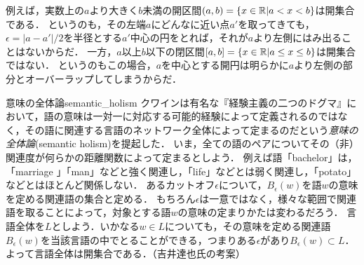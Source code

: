 \documentclass[11pt,a4paper, dvipdfmx]{jsarticle}
\begin{document}
例えば，実数上の$a$より大きく$b$未満の開区間$(a, b) = \{x \in \mathbb{R}| a < x < b\}$は開集合である．
というのも，その左端$a$にどんなに近い点$a'$を取ってきても，$\epsilon=|a-a'|/2$を半径とする$a'$中心の円をとれば，それが$a$より左側にはみ出ることはないからだ．
一方，$a$以上$b$以下の閉区間$[a, b] = \{x \in \mathbb{R}| a \leq  x \leq  b\}$は開集合ではない．
というのもこの場合，$a$を中心とする開円は明らかに$a$より左側の部分とオーバーラップしてしまうからだ．

 


\begin{rei}{意味の全体論}{semantic_holism}
クワインは有名な『経験主義の二つのドグマ』において，語の意味は一対一に対応する可能的経験によって定義されるのではなく，その語に関連する言語のネットワーク全体によって定まるのだという\emph{意味の全体論}(semantic holism)を提起した．
いま，全ての語のペアについてその（非）関連度が何らかの距離関数によって定まるとしよう．
例えば語「bachelor」は，「marriage 」「man」などと強く関連し，「life」などとは弱く関連し，「potato」などとはほとんど関係しない．
あるカットオフ$\epsilon$について，$B_\epsilon(w)$を語$w$の意味を定める関連語の集合と定める．
もちろん$\epsilon$は一意ではなく，様々な範囲で関連語を取ることによって，対象とする語$w$の意味の定まりかたは変わるだろう．
言語全体を$L$としよう．いかなる$w \in L$についても，その意味を定める関連語$B_\epsilon(w)$を当該言語の中でとることができる，つまりある$\epsilon$があり$B_\epsilon(w) \subset L$．
よって言語全体は開集合である．（吉井達也氏の考案）
\end{rei}
\end{document}
